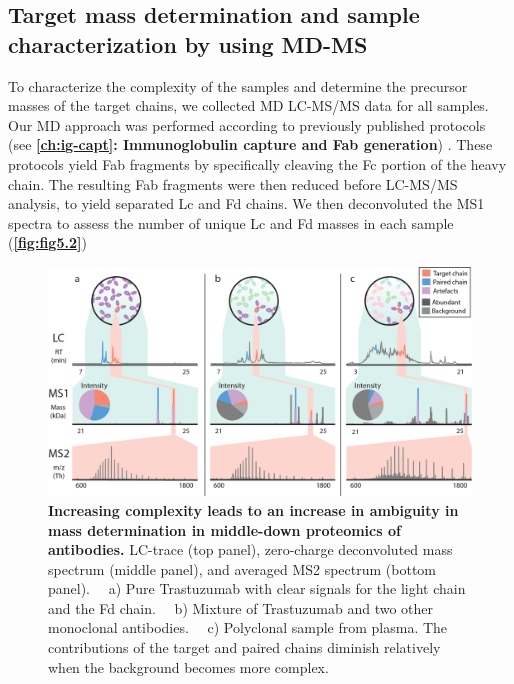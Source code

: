 \subsection{Target mass determination and sample characterization by using MD-MS}
\label{ch:mass-determ}
To characterize the complexity of the samples and determine the precursor masses of the target chains, we collected MD LC-MS/MS data for all samples. Our MD approach was performed according to previously published protocols (see \textbf{\autoref{ch:ig-capt}: Immunoglobulin capture and Fab generation}) \cite{bondt2021direct, bondt2021human}. These protocols yield Fab fragments by specifically cleaving the Fc portion of the heavy chain. The resulting Fab fragments were then reduced before LC-MS/MS analysis, to yield separated Lc and Fd chains. We then deconvoluted the MS1 spectra to assess the number of unique Lc and Fd masses in each sample (\textbf{\autoref{fig:fig5.2}})
\begin{figure}[!htb]
  \center
  \includegraphics[]{Chapter.5/Figures/f2.png}
  \caption{\textbf{Increasing complexity leads to an increase in ambiguity in mass determination in middle-down proteomics of antibodies.} LC-trace (top panel), zero-charge deconvoluted mass spectrum (middle panel), and averaged MS2 spectrum (bottom panel). ~~a) Pure Trastuzumab with clear signals for the light chain and the Fd chain. ~~b) Mixture of Trastuzumab and two other monoclonal antibodies. ~~c) Polyclonal sample from plasma. The contributions of the target and paired chains diminish relatively when the background becomes more complex.}
  \label{fig:fig5.2}
\end{figure}

